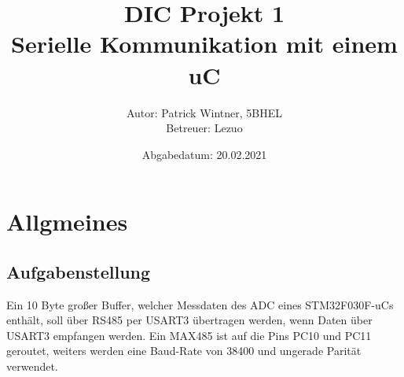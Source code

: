 \documentclass[11pt]{report}
\begin{document}
	\title{DIC Projekt 1\\{\small Serielle Kommunikation mit einem uC}}
	\author{Autor: Patrick Wintner, 5BHEL\\Betreuer: Lezuo}
	\date{Abgabedatum: 20.02.2021}
	\maketitle
	\tableofcontents
	\pagebreak
	\chapter{Allgmeines}
	\section{Aufgabenstellung}
		Ein 10 Byte großer Buffer, welcher Messdaten des ADC eines STM32F030F-uCs enthält, soll über RS485 per USART3 übertragen werden, wenn Daten über USART3 empfangen werden. Ein MAX485 ist auf die Pins PC10 und PC11 geroutet, weiters werden eine Baud-Rate von 38400 und ungerade Parität verwendet.
\end{document}
